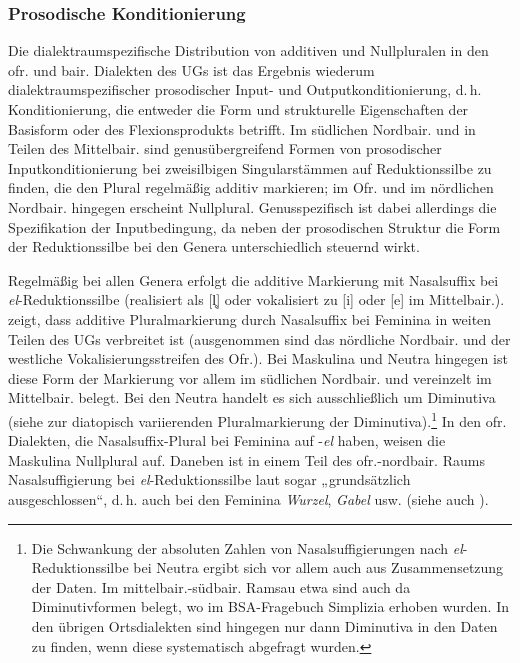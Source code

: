 \subsubsection{Prosodische Konditionierung}
\label{sec:8.3.3.1}
Die dialektraumspezifische Distribution von additiven und Nullpluralen in den ofr. und bair. Dialekten des UGs ist das Ergebnis wiederum dialektraumspezifischer prosodischer Input- und Outputkonditionierung, d.\,h. Konditionierung, die entweder die Form und strukturelle Eigenschaften der Basisform oder des Flexionsprodukts betrifft. Im südlichen Nordbair. und in Teilen des Mittelbair. sind genusübergreifend Formen von prosodischer Inputkonditionierung bei zweisilbigen Singularstämmen auf Reduktionssilbe zu finden, die den Plural regelmäßig additiv markieren; im Ofr. und im nördlichen Nordbair. hingegen erscheint Nullplural. Genusspezifisch ist dabei allerdings die Spezifikation der Inputbedingung, da neben der prosodischen Struktur die Form der Reduktionssilbe bei den Genera unterschiedlich steuernd wirkt. 

Regelmäßig bei allen Genera erfolgt die additive Markierung mit Nasalsuffix bei \textit{el}-Reduktionssilbe (realisiert als [l̥] oder vokalisiert zu [i] oder [e] im Mittelbair.).  zeigt, dass additive Pluralmarkierung durch Nasalsuffix bei Feminina in weiten Teilen des UGs verbreitet ist (ausgenommen sind das nördliche Nordbair. und der westliche Vokalisierungsstreifen des Ofr.). Bei Maskulina und Neutra hingegen ist diese Form der Markierung vor allem im südlichen Nordbair. und vereinzelt im Mittelbair. belegt. Bei den Neutra handelt es sich ausschließlich um Diminutiva (siehe  zur diatopisch variierenden Pluralmarkierung der Diminutiva).\footnote{Die Schwankung der absoluten Zahlen von Nasalsuffigierungen nach \textit{el}{}-Reduktionssilbe bei Neutra ergibt sich vor allem auch aus Zusammensetzung der Daten. Im mittelbair.-südbair. Ramsau etwa sind auch da Diminutivformen belegt, wo im BSA-Fragebuch Simplizia erhoben wurden. In den übrigen Ortsdialekten sind hingegen nur dann Diminutiva in den Daten zu finden, wenn diese systematisch abgefragt wurden.} In den ofr. Dialekten, die Nasalsuffix-Plural bei Feminina auf -\textit{el} haben, weisen die Maskulina Nullplural auf. Daneben ist in einem Teil des ofr.-nordbair. Raums Nasalsuffigierung bei \textit{el}{}-Reduktionssilbe laut \citet[169]{Rowley1997} sogar „grundsätzlich ausgeschlossen“, d.\,h. auch bei den Feminina \textit{Wurzel}, \textit{Gabel} usw. (siehe auch \citealt[148]{Rowley1997}).



